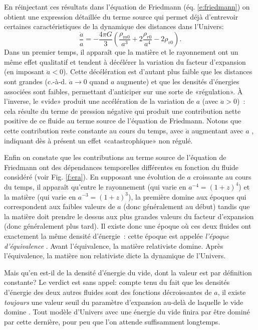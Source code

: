 En réinjectant ces résultats dans l'équation de Friedmann (éq. \ref{e:friedmann})  on obtient une expression détaillée du terme source qui permet déjà d'entrevoir certaines caractéristiques de la dynamique des distances dans l'Univers:
\begin{equation}
\frac{\ddot a}{a}=-\frac{4\pi G}{3}(\frac{\rho_{m0}}{a^3}+2\frac{\rho_{r0}}{a^4}-2\rho_{v0}).
\label{e:esource}
\end{equation}
Dans un premier temps, il apparaît que la matière et le rayonnement ont un même effet qualitatif et tendent à décélérer la variation du facteur d'expansion (en imposant $\ddot a<0$). Cette décélération est d'autant plus faible que les distances  sont grandes (c.-à-d. $\ddot a \rightarrow 0$ quand $a$ augmente) et que les densités d'énergies associées sont faibles, permettant d'anticiper sur une sorte de «régulation». À l'inverse, le «vide» produit une accélération de la variation de $a$ (avec $\ddot a>0$)~: cela résulte du terme de pression négative qui produit une contribution nette positive de ce fluide au terme source de l'équation de Friedmann. Notons que cette contribution reste constante au cours du temps, avec $\ddot a$ augmentant avec $a$ , indiquant dès à présent un effet «catastrophique» non régulé. 

Enfin on constate que les contributions au terme source de l'équation de Friedmann ont des dépendances temporelles différentes en fonction du fluide considéré (voir Fig. \ref{f:era}). En supposant une évolution de $a$ croissante au cours du temps, il apparaît qu'entre le rayonnement (qui varie en $a^{-4}=(1+z)^4$) et la matière (qui varie en $a^{-3}=(1+z)^3$), la première domine aux époques qui correspondent aux faibles valeurs de $a$ (donc généralement au début) tandis que la matière doit prendre le dessus aux plus grandes valeurs du facteur d'expansion (donc généralement plus tard). Il existe donc une époque où ces deux fluides ont exactement la même densité d'énergie~: cette époque est appelée \textit{l'époque d'équivalence} . Avant l'équivalence, la matière relativiste domine. Après l'équivalence, la matière non relativiste dicte la dynamique de l'Univers.

Mais qu'en est-il de la densité d'énergie du vide, dont la valeur est par définition constante? Le verdict est sans appel: compte tenu du fait que les densités d'énergie des deux autres fluides sont des fonctions décroissantes de $a$, il existe \textit{toujours} une valeur seuil du paramètre d'expansion au-delà de laquelle le vide domine . Tout modèle d'Univers avec une énergie du vide finira par être dominé par cette dernière, pour peu que l'on attende suffisamment longtemps.

